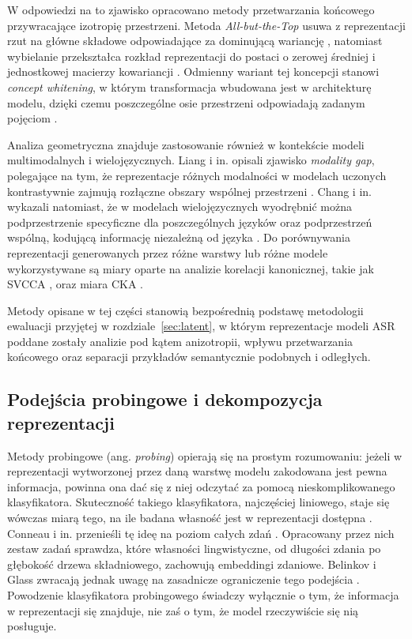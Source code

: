 W odpowiedzi na to zjawisko opracowano metody przetwarzania końcowego przywracające izotropię przestrzeni. Metoda \textit{All-but-the-Top} usuwa z reprezentacji rzut na główne składowe odpowiadające za dominującą wariancję \cite{abtt}, natomiast wybielanie przekształca rozkład reprezentacji do postaci o zerowej średniej i jednostkowej macierzy kowariancji \cite{whiteningbert}. Odmienny wariant tej koncepcji stanowi \textit{concept whitening}, w którym transformacja wbudowana jest w architekturę modelu, dzięki czemu poszczególne osie przestrzeni odpowiadają zadanym pojęciom \cite{whitening}.

Analiza geometryczna znajduje zastosowanie również w kontekście modeli multimodalnych i wielojęzycznych. Liang i in. opisali zjawisko \textit{modality gap}, polegające na tym, że reprezentacje różnych modalności w modelach uczonych kontrastywnie zajmują rozłączne obszary wspólnej przestrzeni \cite{liang2022mind}. Chang i in. wykazali natomiast, że w modelach wielojęzycznych wyodrębnić można podprzestrzenie specyficzne dla poszczególnych języków oraz podprzestrzeń wspólną, kodującą informację niezależną od języka \cite{chang2022geometry}. Do porównywania reprezentacji generowanych przez różne warstwy lub różne modele wykorzystywane są miary oparte na analizie korelacji kanonicznej, takie jak SVCCA \cite{raghu2017svcca}, oraz miara CKA \cite{pmlr-v97-kornblith19a}.

Metody opisane w tej części stanowią bezpośrednią podstawę metodologii ewaluacji przyjętej w rozdziale~\ref{sec:latent}, w którym reprezentacje modeli ASR poddane zostały analizie pod kątem anizotropii, wpływu przetwarzania końcowego oraz separacji przykładów semantycznie podobnych i odległych.

\subsection{Podejścia probingowe i dekompozycja reprezentacji}

Metody probingowe (ang. \textit{probing}) opierają się na prostym rozumowaniu: jeżeli w reprezentacji wytworzonej przez daną warstwę modelu zakodowana jest pewna informacja, powinna ona dać się z niej odczytać za pomocą nieskomplikowanego klasyfikatora. Skuteczność takiego klasyfikatora, najczęściej liniowego, staje się wówczas miarą tego, na ile badana własność jest w reprezentacji dostępna \cite{alain2017probes}. Conneau i in. przenieśli tę ideę na poziom całych zdań \cite{conneau2018cram}. Opracowany przez nich zestaw zadań sprawdza, które własności lingwistyczne, od długości zdania po głębokość drzewa składniowego, zachowują embeddingi zdaniowe. Belinkov i Glass zwracają jednak uwagę na zasadnicze ograniczenie tego podejścia \cite{belinkov2019analysis}. Powodzenie klasyfikatora probingowego świadczy wyłącznie o tym, że informacja w reprezentacji się znajduje, nie zaś o tym, że model rzeczywiście się nią posługuje.

